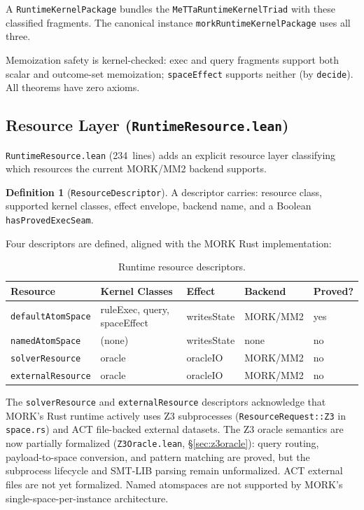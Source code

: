\documentclass[11pt]{article}
\theoremstyle{definition}
\newtheorem{definition}[theorem]{Definition}
\theoremstyle{remark}
\newcommand{\MORK}{\textup{MORK}}
\begin{document}
\noindent
A \texttt{RuntimeKernelPackage} bundles the \texttt{MeTTaRuntimeKernelTriad}
with these classified fragments.  The canonical instance
\texttt{morkRuntimeKernelPackage} uses all three.

Memoization safety is kernel-checked:
exec and query fragments support both scalar and outcome-set memoization;
\texttt{spaceEffect} supports neither (by \texttt{decide}).
All theorems have zero axioms.

\subsection{Resource Layer (\texttt{RuntimeResource.lean})}

\texttt{RuntimeResource.lean} (234~lines) adds an explicit resource layer
classifying which resources the current \MORK{}/MM2 backend supports.

\begin{definition}[\texttt{ResourceDescriptor}]
A descriptor carries: resource class, supported kernel classes, effect
envelope, backend name, and a Boolean \texttt{hasProvedExecSeam}.
\end{definition}

\noindent
Four descriptors are defined, aligned with the \MORK{} Rust implementation:

\begin{table}[ht]
\centering
\caption{Runtime resource descriptors.}
\label{tab:resources}
\begin{tabular}{@{}lllll@{}}
\toprule
\textbf{Resource} & \textbf{Kernel Classes} & \textbf{Effect} & \textbf{Backend} & \textbf{Proved?} \\
\midrule
\texttt{defaultAtomSpace}  & ruleExec, query, spaceEffect & writesState & MORK/MM2 & yes \\
\texttt{namedAtomSpace}    & (none)                       & writesState & none     & no  \\
\texttt{solverResource}    & oracle                       & oracleIO    & MORK/MM2 & no  \\
\texttt{externalResource}  & oracle                       & oracleIO    & MORK/MM2 & no  \\
\bottomrule
\end{tabular}
\end{table}

\noindent
The \texttt{solverResource} and \texttt{externalResource} descriptors
acknowledge that \MORK{}'s Rust runtime actively uses Z3 subprocesses
(\texttt{ResourceRequest::Z3} in \texttt{space.rs}) and ACT
file-backed external datasets.
The Z3 oracle semantics are now partially formalized
(\texttt{Z3Oracle.lean}, \S\ref{sec:z3oracle}): query routing,
payload-to-space conversion, and pattern matching are proved, but the
subprocess lifecycle and SMT-LIB parsing remain unformalized.
ACT external files are not yet formalized.
Named atomspaces are not supported by \MORK{}'s single-space-per-instance
architecture.
\end{document}
